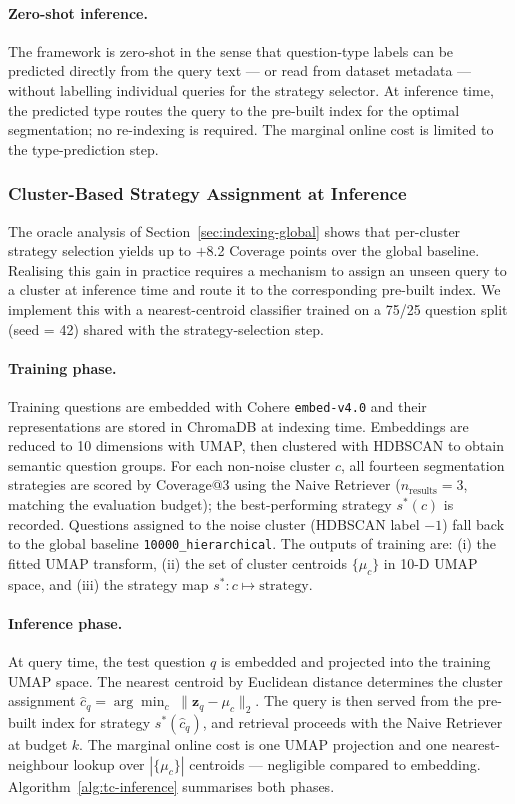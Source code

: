 \paragraph{Zero-shot inference.}
The framework is zero-shot in the sense that question-type labels can be predicted
directly from the query text — or read from dataset metadata — without labelling
individual queries for the strategy selector.
At inference time, the predicted type routes the query to the pre-built index
for the optimal segmentation; no re-indexing is required.
The marginal online cost is limited to the type-prediction step.

\subsubsection{Cluster-Based Strategy Assignment at Inference}
\label{sec:indexing-inference}

The oracle analysis of Section~\ref{sec:indexing-global} shows that per-cluster
strategy selection yields up to $+$8.2 Coverage points over the global baseline.
Realising this gain in practice requires a mechanism to assign an unseen query
to a cluster at inference time and route it to the corresponding pre-built index.
We implement this with a nearest-centroid classifier trained on a 75/25 question
split (seed = 42) shared with the strategy-selection step.

\paragraph{Training phase.}
Training questions are embedded with Cohere \texttt{embed-v4.0} and their
representations are stored in ChromaDB at indexing time.
Embeddings are reduced to 10 dimensions with UMAP, then clustered with
HDBSCAN to obtain semantic question groups.
For each non-noise cluster $c$, all fourteen segmentation strategies are scored
by Coverage@3 using the Naive Retriever ($n_{\text{results}}{=}3$, matching the
evaluation budget); the best-performing strategy $s^*(c)$ is recorded.
Questions assigned to the noise cluster (HDBSCAN label $-1$) fall back to the
global baseline \texttt{10000\_hierarchical}.
The outputs of training are: (i) the fitted UMAP transform, (ii) the set of
cluster centroids $\{\mu_c\}$ in 10-D UMAP space, and (iii) the strategy map
$s^*\!: c \mapsto \text{strategy}$.

\paragraph{Inference phase.}
At query time, the test question $q$ is embedded and projected into the training
UMAP space.
The nearest centroid by Euclidean distance determines the cluster assignment
$\hat{c}_q = \arg\min_{c}\;\|\mathbf{z}_q - \mu_c\|_2$.
The query is then served from the pre-built index for strategy $s^*(\hat{c}_q)$,
and retrieval proceeds with the Naive Retriever at budget $k$.
The marginal online cost is one UMAP projection and one nearest-neighbour lookup
over $|\{\mu_c\}|$ centroids — negligible compared to embedding.
Algorithm~\ref{alg:tc-inference} summarises both phases.

